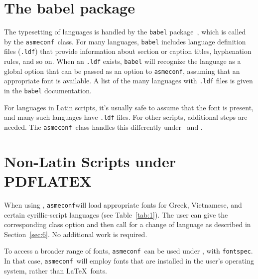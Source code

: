 \documentclass[colorlinks,nofoot,spanish,japanese,russian,greek,ukrainian,vietnamese,french,portuguese,turkish,polish,indonesian,italian,german,latin,serbianc,bidi=basic]{asmeconf}
\newcommand*\FS{{\upshape\texttt{fontspec}}}
\newcommand*\LLT{{\upshape\LuaLaTeX}}
\newcommand*\AC{{\upshape\texttt{asmeconf}}}
\newcommand*\PLT{{\upshape\texttt{\hologo{pdfLaTeX}}}}
\begin{document}
\section{The babel package}
The typesetting of languages is handled by the \texttt{babel} package~\cite{bezos2020}, which is called by the \AC\ class. For many languages, \texttt{babel} includes language definition files (\texttt{.ldf}) that provide information about section or caption titles, hyphenation rules, and so on.  When an \texttt{.ldf} exists, \texttt{babel} will recognize the language as a global option that can be passed as an option to \AC, assuming that an appropriate font is available. A list of the many languages with \texttt{.ldf} files is given in the \texttt{babel} documentation.

For languages in Latin scripts, it's usually safe to assume that the font is present, and many such languages have \texttt{.ldf} files. For other scripts, additional steps are needed. The \AC\ class handles this differently under \PLT\ and \LLT. 

\section{Non-Latin Scripts under PDFLATEX}
When using \PLT, \AC will load appropriate fonts for Greek, Vietnamese, and certain cyrillic-script languages (see Table~\ref{tab:1}). The user can give the corresponding class option and then call for a change of language as described in Section~\ref{sec:6}. No additional work is required.  

To access a broader range of fonts, \AC\ can be used under \LLT, with \FS. In that case, \AC\ will employ fonts that are installed in the user's operating system, rather than \LaTeX\ fonts.
\end{document}
